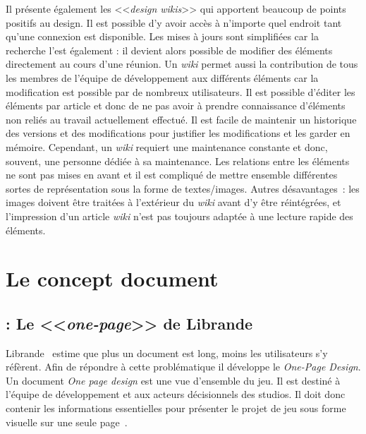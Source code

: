 Il présente également les <<\emph{design wikis}>> qui apportent beaucoup de points positifs au design.
Il est possible d'y avoir accès à n'importe quel endroit tant qu'une connexion est disponible.
Les mises à jours sont simplifiées car la recherche l'est également : il devient alors possible de modifier des éléments directement au cours d'une réunion.
Un \emph{wiki} permet aussi la contribution de tous les membres de l'équipe de développement aux différents éléments car la modification est possible par de nombreux utilisateurs.
Il est possible d'éditer les éléments par article et donc de ne pas avoir à prendre connaissance d'éléments non reliés au travail actuellement effectué.
Il est facile de maintenir un historique des versions et des modifications pour justifier les modifications et les garder en mémoire.
Cependant, un \emph{wiki} requiert une maintenance constante et donc, souvent, une personne dédiée à sa maintenance.
Les relations entre les éléments ne sont pas mises en avant et il est compliqué de mettre ensemble différentes sortes de représentation sous la forme de textes/images.
Autres d\'esavantages~: les images doivent être traitées à l'extérieur du \emph{wiki} avant d'y être réintégrées, et l'impression d'un article \emph{wiki} n'est pas toujours adaptée à une lecture rapide des éléments.\\



\section{Le concept document}
\subsection{ : Le <<\emph{one-page}>> de Librande \cite{onepage_librande}}




Librande~\cite{onepage_librande} estime que plus un document est long, moins les utilisateurs s'y réfèrent.
Afin de répondre à cette problématique il développe le \emph{One-Page Design}.\\
Un document \emph{One page design} est une vue d'ensemble du jeu.
Il est destiné à l'équipe de développement et aux acteurs décisionnels des studios.
Il doit donc contenir les informations essentielles pour présenter le projet de jeu sous forme visuelle sur une seule page~\cite{LevelUpRogers2014}.

